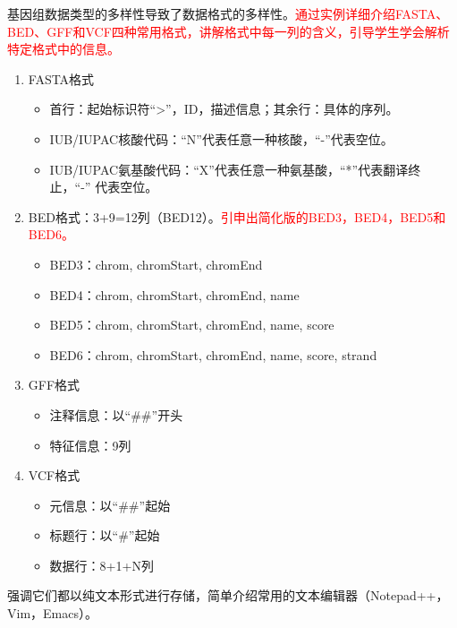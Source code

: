 \documentclass{TIJMUjiaoanLL}
\begin{document}
基因组数据类型的多样性导致了数据格式的多样性。\textcolor{red}{通过实例详细介绍FASTA、BED、GFF和VCF四种常用格式，讲解格式中每一列的含义，引导学生学会解析特定格式中的信息。}
\begin{enumerate}
  \item FASTA格式
    \begin{itemize}
      \item 首行：起始标识符“>”，ID，描述信息；其余行：具体的序列。
      \item IUB/IUPAC核酸代码：“N”代表任意一种核酸，“-”代表空位。
      \item IUB/IUPAC氨基酸代码：“X”代表任意一种氨基酸，“*”代表翻译终止，“-” 代表空位。
    \end{itemize}
  \item BED格式：3+9=12列（BED12）。\textcolor{red}{引申出简化版的BED3，BED4，BED5和BED6。}
    \begin{itemize}
      \item BED3：chrom, chromStart, chromEnd
      \item BED4：chrom, chromStart, chromEnd, name
      \item BED5：chrom, chromStart, chromEnd, name, score
      \item BED6：chrom, chromStart, chromEnd, name, score, strand
    \end{itemize}
  \item GFF格式
    \begin{itemize}
      \item 注释信息：以“\#\#”开头
      \item 特征信息：9列
    \end{itemize}
  \item VCF格式
    \begin{itemize}
      \item 元信息：以“\#\#”起始
      \item 标题行：以“\#”起始
      \item 数据行：8+1+N列
    \end{itemize}
\end{enumerate}

强调它们都以纯文本形式进行存储，简单介绍常用的文本编辑器（Notepad++，Vim，Emacs）。

\otherTail
\newpage
\otherHeader
\end{document}
